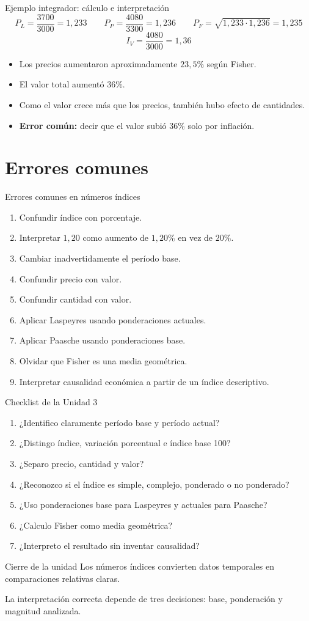 \documentclass[aspectratio=169,11pt]{beamer}
\newcommand{\errorcomun}[1]{\textbf{Error común:} #1}
\begin{document}
\begin{frame}{Ejemplo integrador: cálculo e interpretación}
\small
\[
P_L=\frac{3700}{3000}=1{,}233 \qquad
P_P=\frac{4080}{3300}=1{,}236 \qquad
P_F=\sqrt{1{,}233\cdot1{,}236}=1{,}235
\]
\[
I_V=\frac{4080}{3000}=1{,}36
\]
\begin{itemize}
  \item Los precios aumentaron aproximadamente $23{,}5\%$ según Fisher.
  \item El valor total aumentó $36\%$.
  \item Como el valor crece más que los precios, también hubo efecto de cantidades.
  \item \errorcomun{decir que el valor subió $36\%$ solo por inflación.}
\end{itemize}
\end{frame}

\section{Errores comunes}

\begin{frame}{Errores comunes en números índices}
\small
\begin{enumerate}
  \item Confundir índice con porcentaje.
  \item Interpretar $1{,}20$ como aumento de $1{,}20\%$ en vez de $20\%$.
  \item Cambiar inadvertidamente el período base.
  \item Confundir precio con valor.
  \item Confundir cantidad con valor.
  \item Aplicar Laspeyres usando ponderaciones actuales.
  \item Aplicar Paasche usando ponderaciones base.
  \item Olvidar que Fisher es una media geométrica.
  \item Interpretar causalidad económica a partir de un índice descriptivo.
\end{enumerate}
\end{frame}

\begin{frame}{Checklist de la Unidad 3}
\begin{enumerate}
  \item ¿Identifico claramente período base y período actual?
  \item ¿Distingo índice, variación porcentual e índice base 100?
  \item ¿Separo precio, cantidad y valor?
  \item ¿Reconozco si el índice es simple, complejo, ponderado o no ponderado?
  \item ¿Uso ponderaciones base para Laspeyres y actuales para Paasche?
  \item ¿Calculo Fisher como media geométrica?
  \item ¿Interpreto el resultado sin inventar causalidad?
\end{enumerate}
\end{frame}

\begin{frame}{Cierre de la unidad}
\centering
\Large
Los números índices convierten datos temporales en comparaciones relativas claras.
\vspace{0.8em}

\normalsize
La interpretación correcta depende de tres decisiones: base, ponderación y magnitud analizada.
\end{frame}
\end{document}
